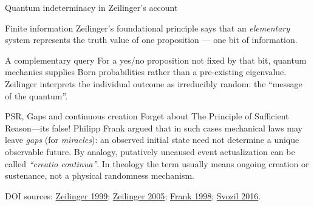 \documentclass{beamer}
\newcommand{\doiref}[2]{%
  \href{https://doi.org/#1}{\textcolor{blue!65!black}{#2}}}
\newcommand{\sourcefoot}[1]{%
  \par\vfill{\tiny\color{black!60}DOI sources: #1\par}}
\begin{document}
\begin{frame}{Quantum indeterminacy in Zeilinger's account}
\small
\begin{block}{Finite information}
Zeilinger's foundational principle says that an \emph{elementary} system
represents the truth value of one proposition --- one bit of information.
\end{block}

\begin{exampleblock}{A complementary query}
For a yes/no proposition not fixed by that bit, quantum mechanics supplies
Born probabilities rather than a pre-existing eigenvalue. Zeilinger interprets
the individual outcome as irreducibly random: the \enquote{message of the
quantum}.
\end{exampleblock}

\begin{alertblock}{PSR, Gaps and continuous creation}
Forget about The Principle of Sufficient Reason---its false!
Philipp Frank argued that in such cases mechanical laws may leave \emph{gaps} (for \emph{miracles}): an observed
initial state need not determine a unique observable future. By analogy,
putatively uncaused event actualization can be called \emph{``creatio continua''}.
In theology the term usually means ongoing creation or sustenance, not a
physical randomness mechanism.
\end{alertblock}

\sourcefoot{\doiref{10.1023/A:1018820410908}{Zeilinger 1999};
\doiref{10.1038/438743a}{Zeilinger 2005};
\doiref{10.1007/978-94-011-5516-8}{Frank 1998};
\doiref{10.3354/esep00171}{Svozil 2016}.}
\end{frame}
\end{document}
